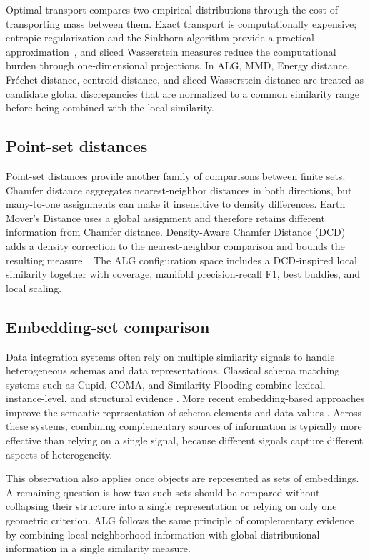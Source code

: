 \documentclass[preprint,12pt]{elsarticle}
\begin{document}
Optimal transport compares two empirical distributions through the cost of
transporting mass between them. Exact transport is computationally expensive;
entropic regularization and the Sinkhorn algorithm provide a practical
approximation~\cite{cuturi2013sinkhorn}, and sliced Wasserstein measures reduce
the computational burden through one-dimensional projections. In ALG, MMD,
Energy distance, Fr\'echet distance, centroid distance, and sliced Wasserstein
distance are treated as candidate global discrepancies that are normalized to a
common similarity range before being combined with the local similarity.

\subsection{Point-set distances}

Point-set distances provide another family of comparisons between finite sets.
Chamfer distance aggregates nearest-neighbor distances in both directions, but
many-to-one assignments can make it insensitive to density differences. Earth
Mover's Distance uses a global assignment and therefore retains different
information from Chamfer distance. Density-Aware Chamfer Distance (DCD) adds a
density correction to the nearest-neighbor comparison and bounds the resulting
measure~\cite{wu2021dcd}. The ALG configuration space includes a DCD-inspired
local similarity together with coverage, manifold precision-recall F1, best
buddies, and local scaling.

\subsection{Embedding-set comparison}

Data integration systems often rely on multiple similarity signals to handle
heterogeneous schemas and data representations. Classical schema matching
systems such as Cupid, COMA, and Similarity Flooding combine lexical,
instance-level, and structural evidence
\cite{madhavan2001cupid,do2002coma,melnik2002similarity}. More recent
embedding-based approaches improve the semantic representation of schema
elements and data values
\cite{koutras2021valentine,du2024isresmat,zhang2025smutf,liu2025magneto}.
Across these systems, combining complementary sources of information is
typically more effective than relying on a single signal, because different
signals capture different aspects of heterogeneity.

This observation also applies once objects are represented as sets of
embeddings. A remaining question is how two such sets should be compared
without collapsing their structure into a single representation or relying on
only one geometric criterion. ALG follows the same principle of complementary
evidence by combining local neighborhood information with global
distributional information in a single similarity measure.
\end{document}
